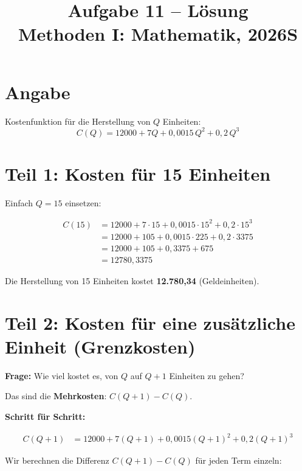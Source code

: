 \documentclass[12pt, a4paper]{article}
\title{\textbf{Aufgabe 11 -- Lösung} \\ Methoden I: Mathematik, 2026S}
\author{}
\date{}
\begin{document}
\maketitle

\section*{Angabe}

Kostenfunktion für die Herstellung von $Q$ Einheiten:
\[
    C(Q) = 12000 + 7Q + 0{,}0015\,Q^2 + 0{,}2\,Q^3
\]

\section*{Teil 1: Kosten für 15 Einheiten}

Einfach $Q = 15$ einsetzen:

\begin{align*}
    C(15) &= 12000 + 7 \cdot 15 + 0{,}0015 \cdot 15^2 + 0{,}2 \cdot 15^3 \\[6pt]
    &= 12000 + 105 + 0{,}0015 \cdot 225 + 0{,}2 \cdot 3375 \\[6pt]
    &= 12000 + 105 + 0{,}3375 + 675 \\[6pt]
    &= \boxed{12780{,}3375}
\end{align*}

Die Herstellung von 15 Einheiten kostet \textbf{12.780,34} (Geldeinheiten).

\section*{Teil 2: Kosten für eine zusätzliche Einheit (Grenzkosten)}

\textbf{Frage:} Wie viel kostet es, von $Q$ auf $Q + 1$ Einheiten zu gehen?

Das sind die \textbf{Mehrkosten}: $C(Q + 1) - C(Q)$.

\bigskip

\textbf{Schritt für Schritt:}

\begin{align*}
    C(Q+1) &= 12000 + 7(Q+1) + 0{,}0015(Q+1)^2 + 0{,}2(Q+1)^3
\end{align*}

Wir berechnen die Differenz $C(Q+1) - C(Q)$ für jeden Term einzeln:

\bigskip
\end{document}
